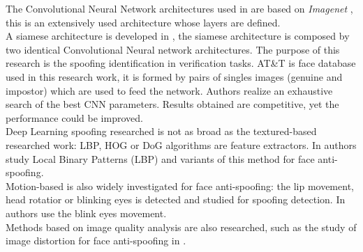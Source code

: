 The Convolutional Neural Network architectures used in \cite{yangLL14,LSTM-CNN} are based on \textit{Imagenet} \cite{imagenet}, this is an extensively used architecture whose layers are defined.\\

A siamese architecture is developed in \cite{Verification}, the siamese architecture is composed by two identical Convolutional Neural network architectures. The purpose of this research is the spoofing identification in verification tasks. AT\&T is face database used in this research work, it is formed by pairs of singles images (genuine and impostor) which are used to feed the network.  Authors realize an exhaustive search of the best CNN parameters. Results obtained are competitive, yet the performance could be improved.\\

Deep Learning spoofing researched is not as broad as the textured-based researched work: LBP, HOG or DoG algorithms are feature extractors. In \cite{LBP_FaceAnti} authors study Local Binary Patterns (LBP) and variants of this method for face anti-spoofing.\\

Motion-based is also widely investigated for face anti-spoofing: the lip movement, head rotatior or blinking eyes is detected and studied for spoofing detection. In \cite{Blink_antispoofing} authors use the blink eyes movement.\\

Methods based on image quality analysis are also researched, such as the study of image distortion for face anti-spoofing in \cite{MSUdatabse}.






